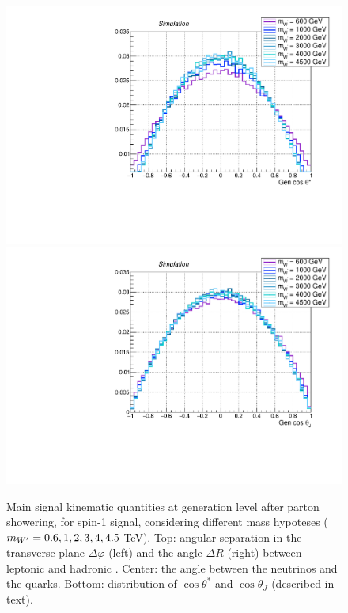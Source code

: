 \begin{figure}[!htb]
\begin{center}
     \includegraphics[width=.495\textwidth]{Gen_v9/XWZInv_g_CosThetaStar.pdf}%
     \includegraphics[width=.495\textwidth]{Gen_v9/XWZInv_g_CosThetaJ.pdf}%
   \end{center}
   \caption{Main signal kinematic quantities at generation level after parton showering, for spin-1 \Wp signal, considering different mass hypoteses ($m_{W'} = 0.6, 1, 2, 3, 4, 4.5$ TeV). Top: angular separation in the transverse plane $\Delta \varphi$ (left) and the angle $\Delta R$ (right) between leptonic \Z and hadronic \W. Center: the angle between the neutrinos and the quarks. Bottom: distribution of $\cos{\theta}^{*}$ and $\cos{\theta}_{J}$ (described in text).}
   \label{fig:genWprimeSignal3}
 \end{figure}

\clearpage

